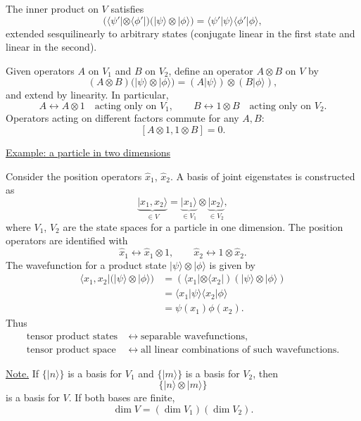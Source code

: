 \documentclass[11pt,a4paper]{article}
\begin{document}
The inner product on $V$ satisfies
\[
    \bigl(\langle\psi'|\otimes\langle\phi'|\bigr)
    \bigl(|\psi\rangle\otimes|\phi\rangle\bigr)
    =\langle\psi'|\psi\rangle\langle\phi'|\phi\rangle,
\]
extended sesquilinearly to arbitrary states (conjugate linear in the
first state and linear in the second).

Given operators $A$ on $V_1$ and $B$ on $V_2$, define an operator
$A\otimes B$ on $V$ by
\[
    (A\otimes B)\bigl(|\psi\rangle\otimes|\phi\rangle\bigr)
    =(A|\psi\rangle)\otimes(B|\phi\rangle),
\]
and extend by linearity. In particular,
\[
    A\longleftrightarrow A\otimes 1
    \quad\text{acting only on }V_1,
    \qquad
    B\longleftrightarrow 1\otimes B
    \quad\text{acting only on }V_2.
\]
Operators acting on different factors commute for any $A,B$:
\[
    [A\otimes 1,1\otimes B]=0.
\]

\medskip
\noindent
\underline{Example: a particle in two dimensions}

Consider the position operators $\hat{x}_1$, $\hat{x}_2$.
A basis of joint eigenstates is constructed as
\[
    \underbrace{|x_1,x_2\rangle}_{\in V}
    =\underbrace{|x_1\rangle}_{\in V_1}
       \otimes\underbrace{|x_2\rangle}_{\in V_2},
\]
where $V_1$, $V_2$ are the state spaces for a particle in one dimension.
The position operators are identified with
\[
    \hat{x}_1\longleftrightarrow\hat{x}_1\otimes 1,
    \qquad
    \hat{x}_2\longleftrightarrow 1\otimes\hat{x}_2.
\]
The wavefunction for a product state $|\psi\rangle\otimes|\phi\rangle$
is given by
\begin{align*}
    \langle x_1,x_2|\bigl(|\psi\rangle\otimes|\phi\rangle\bigr)
        &=(\langle x_1|\otimes\langle x_2|)
          (|\psi\rangle\otimes|\phi\rangle)\\
        &=\langle x_1|\psi\rangle\langle x_2|\phi\rangle\\
        &=\psi(x_1)\phi(x_2).
\end{align*}
Thus
\[
    \begin{aligned}
        \text{tensor product states}
            &\longleftrightarrow\text{separable wavefunctions},\\
        \text{tensor product space}
            &\longleftrightarrow\text{all linear combinations of such wavefunctions}.
    \end{aligned}
\]

\medskip
\noindent
\underline{Note.}
If $\{|n\rangle\}$ is a basis for $V_1$ and $\{|m\rangle\}$ is a basis
for $V_2$, then
\[
    \{|n\rangle\otimes|m\rangle\}
\]
is a basis for $V$. If both bases are finite,
\[
    \dim V=(\dim V_1)(\dim V_2).
\]
\end{document}
